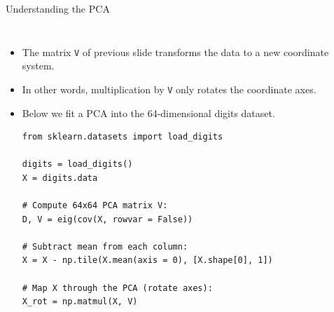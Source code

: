 \documentclass[10pt, aspectratio=169]{beamer} %
\begin{document}
\begin{frame}[fragile, allowframebreaks=0.8]{Understanding the PCA}
		\begin{columns}
	    \begin{itemize}
\item The matrix \verb+V+ of previous slide transforms the data to a new coordinate system.
\item In other words, multiplication by \texttt{V} only rotates the coordinate axes.
\item Below we fit a PCA into the 64-dimensional digits dataset.
\begin{lstlisting}
from sklearn.datasets import load_digits

digits = load_digits()
X = digits.data

# Compute 64x64 PCA matrix V:
D, V = eig(cov(X, rowvar = False))

# Subtract mean from each column:
X = X - np.tile(X.mean(axis = 0), [X.shape[0], 1])

# Map X through the PCA (rotate axes):
X_rot = np.matmul(X, V)

\end{lstlisting}

\end{itemize}
			

\end{columns}
\end{frame}
\end{document}
